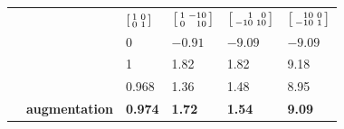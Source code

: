 \documentclass[\ifafour a4paper,12pt,\else a5paper,10pt,\fi%
onecolumn,oneside,article,%
british%
]{memoir}
\theoremstyle{remark}
\theoremstyle{innote}
\renewcommand*{\|}[1][]{\nonscript\:#1\vert\nonscript\:\mathopen{}}
\newcommand*{\sumatrix}[4]{\begin{bsmallmatrix*}[r]#1&#2\\#3&#4\end{bsmallmatrix*}}
\begin{document}
\begin{table}[!p]
%
  \begin{tabular*}{\linewidth}{clw{c}{0.12\linewidth}w{c}{0.12\linewidth}w{c}{0.12\linewidth}w{c}{0.12\linewidth}}
&    &$\sumatrix{1}{0}{0}{1}$
 &$\sumatrix{1}{-10}{0}{10}$
 &$\sumatrix{1}{0}{-10}{10}$
 &$\sumatrix{10}{0}{-10}{1}$
     \\[2\jot]
 &\parbox{0.21\linewidth}{}
 &\textcolor{mygray}{\footnotesize $0$}
 &\textcolor{mygray}{\footnotesize $-0.91$}
 &\textcolor{mygray}{\footnotesize $-9.09$}
 &\textcolor{mygray}{\footnotesize $-9.09$}
     \\[0\jot]
 &\parbox{0.21\linewidth}{}
 &\textcolor{mygray}{\footnotesize 1}
 &\textcolor{mygray}{\footnotesize 1.82}
 &\textcolor{mygray}{\footnotesize 1.82}
 &\textcolor{mygray}{\footnotesize 9.18}
    \\[5\jot]
 &\parbox{0.21\linewidth}{\color{myred}}
 &\textcolor{myred}{0.968}
 &\textcolor{myred}{1.36}
 &\textcolor{myred}{1.48}
 &\textcolor{myred}{8.95}
 \\[1\jot]
 &\parbox{0.21\linewidth}{\color{mypurpleblue}\bfseries augmentation}
 &\textcolor{mypurpleblue}{\bfseries 0.974}
 &\textcolor{mypurpleblue}{\bfseries 1.72}
 &\textcolor{mypurpleblue}{\bfseries 1.54}
 &\textcolor{mypurpleblue}{\bfseries 9.09}
 \\[5\jot]

\end{tabular*}
\end{table}
\end{document}
